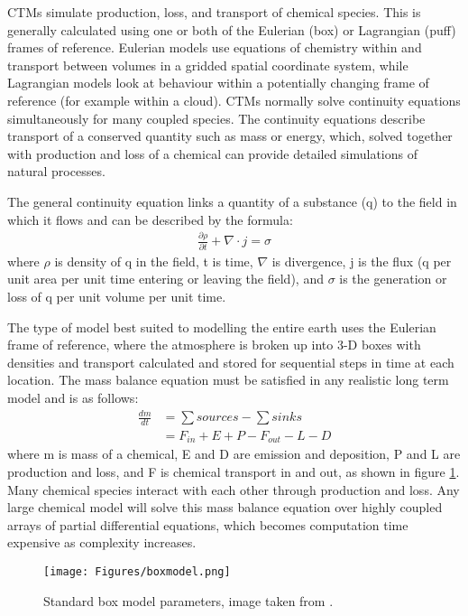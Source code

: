     
    CTMs simulate production, loss, and transport of chemical species.
    This is generally calculated using one or both of the Eulerian (box) or Lagrangian (puff) frames of reference.
    Eulerian models use equations of chemistry within and transport between volumes in a gridded spatial coordinate system, while Lagrangian models look at behaviour within a potentially changing frame of reference (for example within a cloud).
    CTMs normally solve continuity equations simultaneously for many coupled species.
    The continuity equations describe transport of a conserved quantity such as mass or energy, which, solved together with production and loss of a chemical can provide detailed simulations of natural processes.
    
    The general continuity equation links a quantity of a substance (q) to the field in which it flows and can be described by the formula:
    \begin{align*}
      \frac{\partial \rho}{\partial t} + \nabla \cdot j = \sigma 
    \end{align*}
    where $\rho$ is density of q in the field, t is time, $\nabla$ is divergence, j is the flux (q per unit area per unit time entering or leaving the field), and $\sigma$ is the generation or loss of q per unit volume per unit time.
    
    
    The type of model best suited to modelling the entire earth uses the Eulerian frame of reference, where the atmosphere is broken up into 3-D boxes with densities and transport calculated and stored for sequential steps in time at each location.
    The mass balance equation must be satisfied in any realistic long term model and is as follows: 
    \begin{align*}
      \frac{dm}{dt} & = \sum{sources}-\sum{sinks} \\
                    & = F_{in} + E + P - F_{out} - L - D 
    \end{align*}
    where m is mass of a chemical, E and D are emission and deposition, P and L are production and loss, and F is chemical transport in and out, as shown in figure \ref{LR:Models:fig_boxmodel}.
    Many chemical species interact with each other through production and loss. 
    Any large chemical model will solve this mass balance equation over highly coupled arrays of partial differential equations, which becomes computation time expensive as complexity increases.
    
    \begin{figure}
      \texttt{[image: Figures/boxmodel.png]}
      \caption{ %
        Standard box model parameters, image taken from \textcite{Jacob_1999_book}. }
      \label{LR:Models:fig_boxmodel}
    \end{figure}
    
